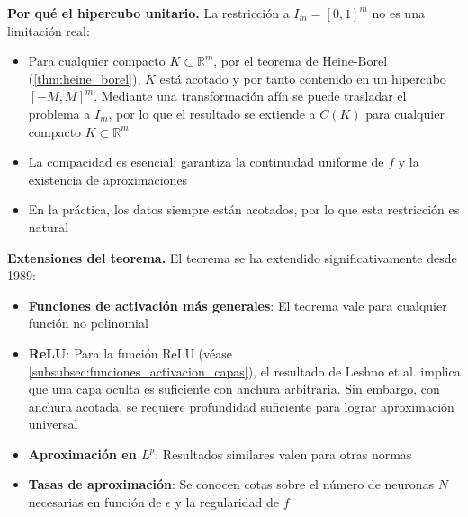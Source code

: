 \textbf{Por qué el hipercubo unitario.}
La restricción a \(I_m = [0,1]^m\) no es una limitación real:
\begin{itemize}
	\item Para cualquier compacto \(K \subset \mathbb{R}^m\), por el teorema de Heine-Borel (\autoref{thm:heine_borel}), \(K\) está acotado y por tanto contenido en un hipercubo \([-M, M]^m\). Mediante una transformación afín se puede trasladar el problema a \(I_m\), por lo que el resultado se extiende a \(C(K)\) para cualquier compacto \(K \subset \mathbb{R}^m\)
	\item La compacidad es esencial: garantiza la continuidad uniforme de \(f\) y la existencia de aproximaciones
	\item En la práctica, los datos siempre están acotados, por lo que esta restricción es natural
\end{itemize}

\textbf{Extensiones del teorema.}
El teorema se ha extendido significativamente desde 1989:
\begin{itemize}
	\item \textbf{Funciones de activación más generales}: El teorema vale para cualquier función no polinomial \citep{leshno1993multilayer}
	\item \textbf{ReLU}: Para la función \gls{ReLU} (véase \autoref{subsubsec:funciones_activacion_capas}), el resultado de Leshno et al. implica que una capa oculta es suficiente con anchura arbitraria. Sin embargo, con anchura acotada, se requiere profundidad suficiente para lograr aproximación universal \citep{lu2017expressive,hanin2019universal}
	\item \textbf{Aproximación en \(L^p\)}: Resultados similares valen para otras normas \citep{hornik1991approximation}
	\item \textbf{Tasas de aproximación}: Se conocen cotas sobre el número de neuronas \(N\) necesarias en función de \(\epsilon\) y la regularidad de \(f\) \citep{barron1993universal}
\end{itemize}

